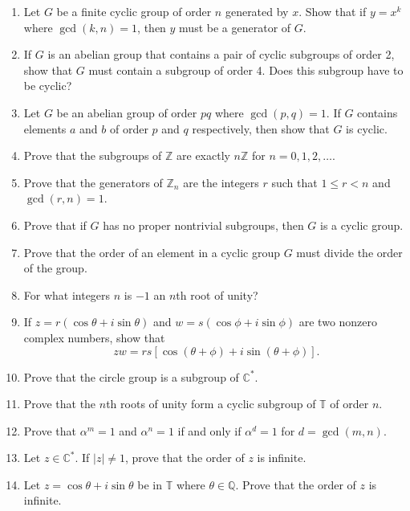{\begin{enumerate}
 
\item
Let $G$ be a finite cyclic group of order $n$ generated by $x$. Show
that if $y = x^k$ where $\gcd(k,n) = 1$, then $y$ must be a generator
of $G$.
 
 
\item
If $G$ is an abelian group that contains a pair of cyclic subgroups of
order 2, show that $G$ must contain a subgroup of order 4. Does this
subgroup have to be cyclic?
 
 
\item
Let $G$ be an abelian group of order $pq$ where $\gcd(p,q) = 1$.  If
$G$ contains elements $a$ and $b$ of order $p$ and $q$ respectively,
then show that $G$ is cyclic. 
 
 
\item
Prove that the subgroups of ${\mathbb Z}$ are exactly $n{\mathbb Z}$ for $n
= 0, 1, 2, \ldots$. 
 
 
\item
Prove that the generators of ${\mathbb Z}_n$ are the integers $r$ such
that $1 \leq r < n$ and $\gcd(r,n) =  1$. 
 
 
\item
Prove that if $G$ has no proper nontrivial subgroups, then $G$ is a 
cyclic group.
 
 
 
\item
Prove that the order of an element in a cyclic group $G$ must divide
the order of the  group. 
 
 
\item
For what integers $n$ is $-1$ an $n$th root of unity?
 
 
\item
If $z = r( \cos \theta + i \sin \theta)$ and $w = s(\cos \phi + i \sin
\phi)$ are two nonzero complex numbers, show that
\[
zw = rs[ \cos( \theta + \phi)  + i \sin( \theta + \phi)].
\]
 
 
\item
Prove that the circle group is a subgroup of  ${\mathbb C}^*$.
 
 
\item
Prove that the $n$th roots of unity form a cyclic subgroup of ${\mathbb
T}$  of order $n$. 
 
 
\item
Prove that $\alpha^m =1$ and $\alpha^n = 1$ if and only if $\alpha^d = 1$
for $d = \gcd(m,n)$.
 
 
\item
Let $z \in {\mathbb C}^\ast$. If $|z| \neq 1$, prove that the order of
$z$ is infinite. 
 
 
\item
Let $z =\cos \theta + i \sin \theta$ be in ${\mathbb T}$ where $\theta
\in {\mathbb Q}$.  Prove that the order of $z$ is infinite.
 
\end{enumerate}
}
 
